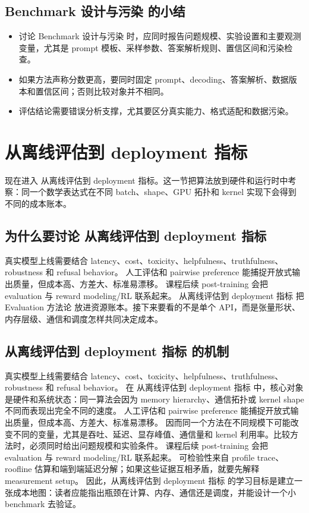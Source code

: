 \documentclass[a4paper]{article}
\begin{document}
\subsection{Benchmark 设计与污染 的小结}
\begin{itemize}
\item 讨论 Benchmark 设计与污染 时，应同时报告问题规模、实验设置和主要观测变量，尤其是 prompt 模板、采样参数、答案解析规则、置信区间和污染检查。
\item 如果方法声称分数更高，要同时固定 prompt、decoding、答案解析、数据版本和置信区间；否则比较对象并不相同。
\item 评估结论需要错误分析支撑，尤其要区分真实能力、格式适配和数据污染。
\end{itemize}
\section{从离线评估到 deployment 指标}
现在进入 从离线评估到 deployment 指标。这一节把算法放到硬件和运行时中考察：同一个数学表达式在不同 batch、shape、GPU 拓扑和 kernel 实现下会得到不同的成本账本。
\subsection{为什么要讨论 从离线评估到 deployment 指标}
真实模型上线需要结合 latency、cost、toxicity、helpfulness、truthfulness、robustness 和 refusal behavior。
人工评估和 pairwise preference 能捕捉开放式输出质量，但成本高、方差大、标准易漂移。
课程后续 post-training 会把 evaluation 与 reward modeling/RL 联系起来。
从离线评估到 deployment 指标 把 Evaluation 方法论 放进资源账本。接下来要看的不是单个 API，而是张量形状、内存层级、通信和调度怎样共同决定成本。
\subsection{从离线评估到 deployment 指标 的机制}
真实模型上线需要结合 latency、cost、toxicity、helpfulness、truthfulness、robustness 和 refusal behavior。 在 从离线评估到 deployment 指标 中，核心对象是硬件和系统状态：同一算法会因为 memory hierarchy、通信拓扑或 kernel shape 不同而表现出完全不同的速度。
人工评估和 pairwise preference 能捕捉开放式输出质量，但成本高、方差大、标准易漂移。 因而同一个方法在不同规模下可能改变不同的变量，尤其是吞吐、延迟、显存峰值、通信量和 kernel 利用率。比较方法时，必须同时给出问题规模和实验条件。
课程后续 post-training 会把 evaluation 与 reward modeling/RL 联系起来。 可检验性来自 profile trace、roofline 估算和端到端延迟分解；如果这些证据互相矛盾，就要先解释 measurement setup。
因此，从离线评估到 deployment 指标 的学习目标是建立一张成本地图：读者应能指出瓶颈在计算、内存、通信还是调度，并能设计一个小 benchmark 去验证。
\end{document}
